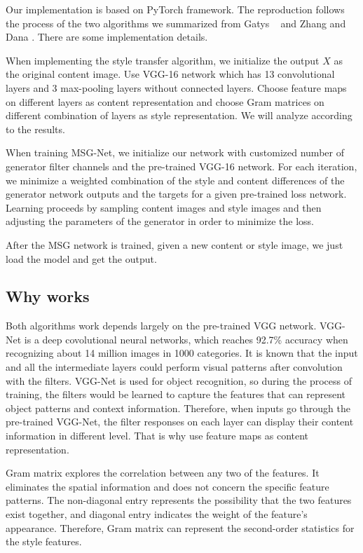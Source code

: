 \documentclass[10pt,twocolumn,letterpaper]{article}
\begin{document}
Our implementation is based on PyTorch framework. The reproduction follows the process of the two algorithms we summarized from Gatys \etal~\cite{Authors01} and Zhang and Dana \cite{Authors04}. There are some implementation details.

When implementing the style transfer algorithm, we initialize the output $X$ as the original content image. Use VGG-16 network which has 13 convolutional layers and 3 max-pooling layers without connected layers. Choose feature maps on different layers as content representation and choose Gram matrices on different combination of layers as style representation. We will analyze according to the results.

When training MSG-Net, we initialize our network with customized number of generator filter channels and the pre-trained VGG-16 network. For each iteration, we minimize a weighted combination of the style and content differences of the generator network outputs and the targets for a given pre-trained loss network. Learning proceeds by sampling content images and style images and then adjusting the parameters of the generator in order to minimize the loss.

After the MSG network is trained, given a new content or style image, we just load the model and get the output. 


\subsection{Why works}
Both algorithms work depends largely on the pre-trained VGG network. VGG-Net \cite{Authors05} is a deep covolutional neural networks, which reaches 92.7\% accuracy when recognizing about 14 million images in 1000 categories. It is known that the input and all the intermediate layers could perform visual patterns after convolution with the filters. VGG-Net is used for object recognition, so during the process of training, the filters would be learned to capture the features that can represent object patterns and context information. Therefore, when inputs go through the pre-trained VGG-Net, the filter responses on each layer can display their content information in different level. That is why use feature maps as content representation.

Gram matrix explores the correlation between any two of the features. It eliminates the spatial information and does not concern the specific feature patterns. The non-diagonal entry represents the possibility that the two features exist together, and diagonal entry indicates the weight of the feature's appearance. Therefore, Gram matrix can represent the second-order statistics for the style features.
\end{document}

